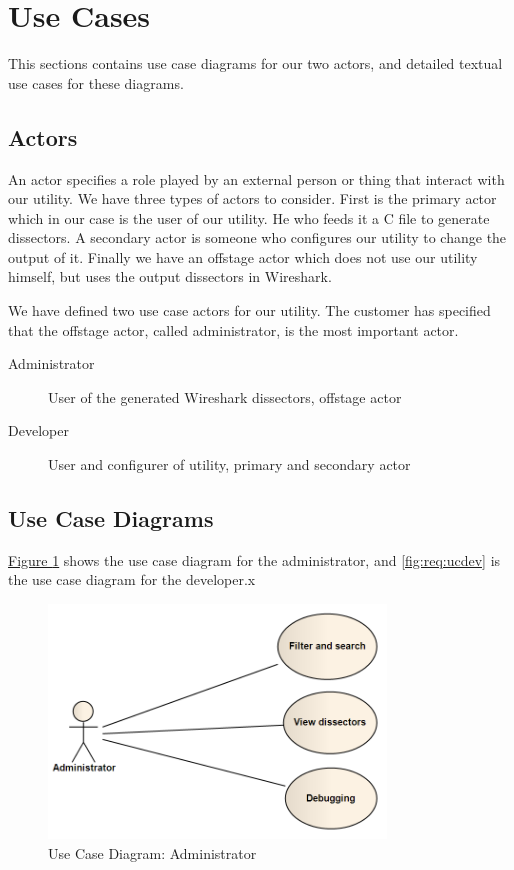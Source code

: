 \section{Use Cases}
\label{sec:req:usecases}
This sections contains use case diagrams for our two actors, and detailed
textual use cases for these diagrams.

\subsection{Actors}
An actor specifies a role played by an external person or thing that interact
with our utility. We have three types of actors to consider. First is the
primary actor which in our case is the user of our utility. He who feeds it a
C file to generate dissectors. A secondary actor is someone who configures our
utility to change the output of it. Finally we have an offstage actor which
does not use our utility himself, but uses the output dissectors in Wireshark.

We have defined two use case actors for our utility. The customer has specified
that the offstage actor, called administrator, is the most important actor.
\begin{description}
	\item[Administrator] User of the generated Wireshark dissectors, offstage actor
	\item[Developer] User and configurer of utility, primary and secondary actor
\end{description}

\subsection{Use Case Diagrams}
\hyperref[fig:req:ucadm]{Figure \ref*{fig:req:ucadm}} shows the use case
diagram for the administrator, and \autoref{fig:req:ucdev} is the use case
diagram for the developer.x
\begin{figure}[htbp]
	\center
	\includegraphics[width=0.8\textwidth]{./planning/img/administrator.png}
	\caption{Use Case Diagram: Administrator\label{fig:req:ucadm}}
\end{figure}

